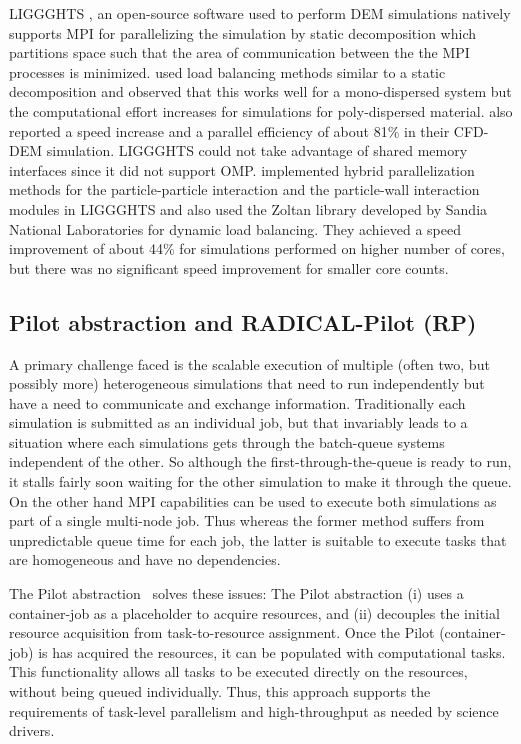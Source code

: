 \documentclass[preprint,11pt,authoryear]{elsarticle}
\begin{document}
LIGGGHTS \citep{Kloss2012}, an open-source software used to perform DEM simulations natively 
supports MPI for parallelizing the simulation by static decomposition which partitions space such that 
the area of communication between the the MPI processes is minimized. \cite{kacianauskas2010} used 
load balancing methods similar to a static decomposition and observed that this works well for a 
mono-dispersed system but the computational effort increases for simulations for poly-dispersed 
material. \cite{Gopalakrishnan2013} also reported a speed increase and a parallel efficiency of about 
81\% in their CFD-DEM simulation. LIGGGHTS could not take advantage of shared memory interfaces 
since it did not support OMP. \cite{Berger2015} implemented hybrid parallelization methods for the 
particle-particle interaction and the particle-wall interaction modules in LIGGGHTS and also used the 
Zoltan library \citep{Boman2012} developed by Sandia National Laboratories for dynamic load 
balancing. They achieved a speed improvement of about 44\% for simulations performed on higher 
number of cores, but there was no significant speed improvement for smaller core counts. 

\subsection{Pilot abstraction and RADICAL-Pilot (RP)}
A primary challenge faced is the scalable execution of multiple (often two,
but possibly more) heterogeneous simulations that need to run independently
but have a need to communicate and exchange information. Traditionally each
simulation is submitted as an individual job, but that invariably leads
to a situation where each simulations gets through the batch-queue systems
independent of the other. So although the first-through-the-queue is ready to
run, it stalls fairly soon waiting for the other simulation to make it through
the queue.  On the other hand MPI capabilities can be used to  execute both
simulations as part of a single multi-node job.  Thus whereas the former
method suffers from unpredictable queue time for each job, the latter is
suitable to execute tasks that are homogeneous and have no dependencies.


The Pilot abstraction~\cite{pstar12} solves these issues:  The Pilot abstraction 
(i) uses a container-job as a placeholder to acquire resources, and (ii) decouples 
the initial resource acquisition from task-to-resource assignment. Once the 
Pilot (container-job) is has acquired the resources, it can be populated with 
computational tasks. This functionality allows all tasks to be executed directly 
on the resources, without being queued individually. Thus, this approach supports 
the requirements of task-level parallelism and high-throughput as needed by 
science drivers.
\end{document}
